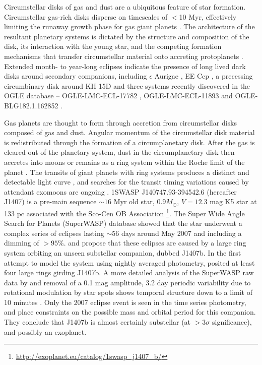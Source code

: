 \documentclass{emulateapj}
\begin{document}
Circumstellar disks of gas and dust are a ubiquitous feature of star
formation.
Circumstellar gas-rich disks disperse on timescales of $<$10 Myr,
effectively limiting the runaway growth phase for gas giant planets
\citep{Williams11}.
The architecture of the resultant planetary systems is dictated by the
structure and composition of the disk, its interaction with the young
star, and the competing formation mechanisms that transfer
circumstellar material onto accreting protoplanets
\citep[e.g. see reviews by][]{Armitage11,Kley12}. 
Extended month- to year-long eclipses indicate the presence of long
lived dark disks around secondary companions, including $\epsilon$
Aurigae \citep{Guinan02, Kloppenborg10}, EE Cep \citep{Mikolajewski99,
  Graczyk03, Mikolajewski05}, a precessing circumbinary disk around KH
15D \citep{Hamilton05,Winn06b} and three systems recently discovered
in the OGLE database -- OGLE-LMC-ECL-17782 \citep{Graczyk11},
OGLE-LMC-ECL-11893 \citep{Dong14} and OGLE-BLG182.1.162852
\citep{Rattenbury14}.

Gas planets are thought to form through accretion from circumstellar disks
composed of gas and dust.
Angular momentum of the circumstellar disk material is redistributed
through the formation of a circumplanetary disk.
After the gas is cleared out of the planetary system, dust in the
circumplanetary disk then accretes into moons or remains as a ring
system within the Roche limit of the planet \citep{Canup02, Magni04,
  Ward10}.
The transits of giant planets with ring systems produces a distinct
and detectable light curve \citep{Barnes04, Tusnski11}, and searches
for the transit timing variations caused by attendant exomoons are
ongoing \citep{Kipping12, Kipping13}.
1SWASP J140747.93-394542.6 (hereafter J1407) is a pre-main sequence
$\sim 16$ Myr old star, $0.9 M_{\odot}$, $V=12.3$ mag K5 star at 133
pc associated with the Sco-Cen OB Association \citep{Mamajek12,
  vanWerkhoven14,
  Kenworthy15}\footnote{\url{http://exoplanet.eu/catalog/1swasp_j1407_b/}}.
The Super Wide Angle Search for Planets (SuperWASP) database
\citep{Butters10} showed that the star underwent a complex series of
eclipses lasting $\sim56$ days around May 2007 and including a dimming
of $ > 95 \%$.
\citet{Mamajek12} and \citet{vanWerkhoven14} propose that these
eclipses are caused by a large ring system orbiting an unseen
substellar companion, dubbed J1407b.
In the first attempt to model the system using nightly averaged
photometry, \citet{Mamajek12} posited at least four large rings
girding J1407b.
A more detailed analysis of the SuperWASP raw data by
\citet{vanWerkhoven14} and removal of a 0.1 mag amplitude, 3.2 day
periodic variability due to rotational modulation by star spots shows
temporal structure down to a limit of 10 minutes
\citep{vanWerkhoven14}.
Only the 2007 eclipse event is seen in the time series photometry, and
\citet{Kenworthy15} place constraints on the possible mass and orbital
period for this companion.
They conclude that J1407b is almost certainly substellar (at
$>$3$\sigma$ significance), and possibly an exoplanet.
\end{document}
